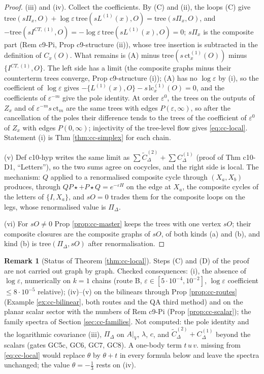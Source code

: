 \documentclass[11pt]{article}
\numberwithin{equation}{section}
\theoremstyle{plain}
\theoremstyle{definition}
\newtheorem{remark}[theorem]{Remark}
\newcommand{\AV}{A|_V}
\begin{document}
\begin{proof}
(iii) and (iv). Collect the coefficients. By (C) and (ii), the loops (C) give $\mathrm{tree}(s\Pi_x,O)+\log\varepsilon\,\mathrm{tree}(sL^{(1)}(x),O)=\mathrm{tree}(s\Pi_x,O)$, and $-\mathrm{tree}(sI^{CT,(1)},O)=-\log\varepsilon\,\mathrm{tree}(sL^{(1)}(x),O)=0$; $s\Pi_x$ is the composite part (Rem c9-Pi, Prop c9-structure (ii)), whose tree insertion is subtracted in the definition of $C_x(O)$. What remains is (A) minus $\mathrm{tree}(s\,\mathrm{ct}^{(1)}_x(O))$ minus $\{I^{CT,(1)},O\}$. The left side has a limit (the composite graphs minus their counterterm trees converge, Prop c9-structure (i)); (A) has no $\log\varepsilon$ by (i), so the coefficient of $\log\varepsilon$ gives $-\{L^{(1)}(x),O\}-s\,\mathrm{lc}^{(1)}_x(O)=0$, and the coefficients of $\varepsilon^{-m}$ give the pole identity. At order $\varepsilon^0$, the trees on the outputs of $Z_x$ and of $\varepsilon^{-m}s\,\mathrm{ct}_m$ are the same trees with edges $P(\varepsilon,\infty)$, so after the cancellation of the poles their difference tends to the trees of the coefficient of $\varepsilon^0$ of $Z_x$ with edges $P(0,\infty)$; injectivity of the tree-level flow gives \eqref{eq:cc-local}. Statement (i) is Thm \ref{thm:cc-simplex} for each chain.

(v) Def c10-hyp writes the same limit as $\sum\widetilde C^{(2)}_\Delta+\sum C^{(1)}_\Delta$ (proof of Thm c10-D1, ``Letters''), so the two sums agree on cocycles, and the right side is local. The mechanism: $Q$ applied to a renormalised composite cycle through $(X_a,X_b)$ produces, through $QP\star+P\star Q=e^{-\varepsilon H}$ on the edge at $X_a$, the composite cycles of the letters of $\{I,X_a\}$, and $sO=0$ trades them for the composite loops on the legs, whose renormalised value is $\Pi_\Delta$.

(vi) For $sO\ne0$ Prop \ref{prop:cc-master} keeps the trees with one vertex $sO$; their composite closures are the composite graphs of $sO$, of both kinds (a) and (b), and kind (b) is $\mathrm{tree}(\Pi_\Delta,sO)$ after renormalisation.
\end{proof}

\begin{remark}[Status of Theorem \ref{thm:cc-local}]
\label{rem:cc-localstatus}
Steps (C) and (D) of the proof are not carried out graph by graph. Checked consequences: (i), the absence of $\log\varepsilon$, numerically on $k=1$ chains (route B, $\varepsilon\in[5\cdot10^{-4},10^{-2}]$, $\log\varepsilon$ coefficient $\le8\cdot10^{-5}$ relative); (iv)--(v) on the bilinears through Prop \ref{prop:cc-routes} (Example \ref{ex:cc-bilinear}, both routes and the QA third method) and on the planar scalar sector with the numbers of Rem c9-Pi (Prop \ref{prop:cc-scalar}); the family spectra of Section \ref{sec:cc-families}. Not computed: the pole identity and the logarithmic covariance (iii), $\Pi_\Delta$ on $\AV$, $\lambda$, $c$, and $\widetilde C^{(2)}_\Delta+C^{(1)}_\Delta$ beyond the scalars (gates GC5c, GC6, GC7, GC8). A one-body term $t\,u\,v.$ missing from \eqref{eq:cc-local} would replace $\theta$ by $\theta+t$ in every formula below and leave the spectra unchanged; the value $\theta=-\tfrac13$ rests on (iv).
\end{remark}
\end{document}
